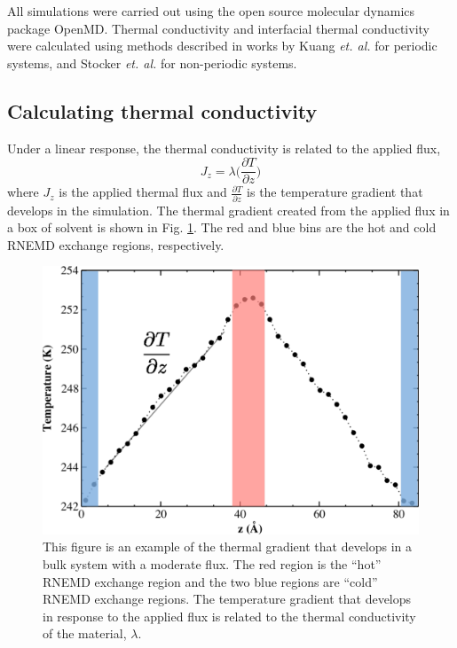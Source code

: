 All simulations were carried out using the open source molecular dynamics package OpenMD.\cite{openmd}
Thermal conductivity and interfacial thermal conductivity were calculated using methods described in works by Kuang \textit{et. al.} for periodic systems,\cite{Kuang:2011ef} and Stocker \textit{et. al.}  for non-periodic systems.\cite{Stocker:2014qq}

\subsection{Calculating thermal conductivity}
Under a linear response, the thermal conductivity is related to the applied flux,
\begin{equation}
    J_z = \lambda \Big(\frac{\partial T}{\partial z}\Big)	
\end{equation}
where $J_z$ is the applied thermal flux and $\frac{\partial T}{\partial z}$ is the temperature gradient that develops in the simulation.
The thermal gradient created from the applied flux in a box of solvent is shown in Fig. \ref{fig:lambda-grad}. The red and blue bins are the hot and cold RNEMD exchange regions, respectively.

\begin{figure}
    \includegraphics[scale=0.6]{figures/bulk-gradient2.pdf}
    \caption{This figure is an example of the thermal gradient that develops in a bulk system with a moderate flux. The red region is the ``hot'' RNEMD exchange region and the two blue regions are ``cold'' RNEMD exchange regions. The temperature gradient that develops in response to the applied flux is related to the thermal conductivity of the material, $\lambda$.}
    \label{fig:lambda-grad}
\end{figure}

